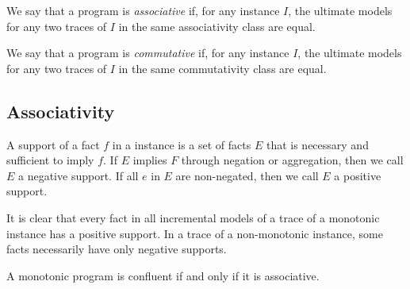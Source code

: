 \begin{definition}
%
We say that a \lang program is {\em associative} if, for any instance $I$,  the
ultimate models for any two traces of $I$ in the same associativity class are
equal.
%
\end{definition}

\begin{definition}
%
We say that a \lang program is {\em commutative} if, for any instance $I$, the
ultimate models for any two traces of $I$ in the same commutativity class are
equal.
%
\end{definition}


\subsection{Associativity}

%
%

\begin{definition}
%
A support of a fact $f$ in a \lang instance is a set of facts $E$ that is
necessary and sufficient to imply $f$.  If $E$ implies $F$ through negation or
aggregation, then we call $E$ a negative support.  If all $e$ in $E$ are
non-negated, then we call $E$ a positive support.
%
\end{definition}



It is clear that every fact in all incremental models of a trace of a monotonic
\lang instance has a positive support.  In a trace of a non-monotonic \lang
instance, some facts necessarily have only negative supports.

\begin{lemma}
%
A monotonic \lang program is confluent if and only if it is associative.
%
\end{lemma}
%


